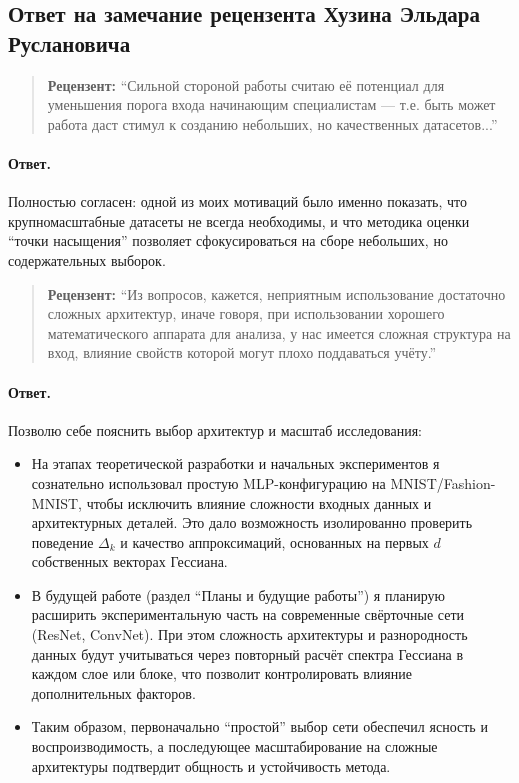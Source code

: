 \documentclass[11pt]{article}
\begin{document}
\pagestyle{empty}

\begin{center}
    \subsection*{Ответ на замечание рецензента Хузина Эльдара Руслановича}
\end{center}

\begin{quote}
    \textbf{Рецензент:}
    ``Сильной стороной работы считаю её потенциал для уменьшения порога входа начинающим специалистам --- т.е. быть может
    работа даст стимул к созданию небольших, но качественных датасетов...''
\end{quote}

\paragraph{Ответ.}
Полностью согласен: одной из моих мотиваций было именно показать, что крупномасштабные датасеты не всегда необходимы, и
что методика оценки ``точки насыщения'' позволяет сфокусироваться на сборе небольших, но содержательных выборок.

\begin{quote}
    \textbf{Рецензент:}
    ``Из вопросов, кажется, неприятным использование достаточно сложных архитектур, иначе говоря, при использовании хорошего
    математического аппарата для анализа, у нас имеется сложная структура на вход, влияние свойств которой могут плохо
    поддаваться учёту.''
\end{quote}

\paragraph{Ответ.}
Позволю себе пояснить выбор архитектур и масштаб исследования:
\begin{itemize}
    \item На этапах теоретической разработки и начальных экспериментов я сознательно использовал простую MLP-конфигурацию
          на MNIST/Fashion-MNIST, чтобы исключить влияние сложности входных данных и архитектурных деталей. Это дало возможность
          изолированно проверить поведение $\Delta_k$ и качество аппроксимаций, основанных на первых $d$ собственных векторах
          Гессиана.
    \item В будущей работе (раздел ``Планы и будущие работы'') я планирую расширить экспериментальную часть на современные
          свёрточные сети (ResNet, ConvNet). При этом сложность архитектуры и разнородность данных будут учитываться через 
          повторный расчёт спектра Гессиана в каждом слое или блоке, что позволит контролировать влияние дополнительных факторов.
    \item Таким образом, первоначально ``простой'' выбор сети обеспечил ясность и воспроизводимость, а последующее
          масштабирование на сложные архитектуры подтвердит общность и устойчивость метода.
\end{itemize}
\end{document}
